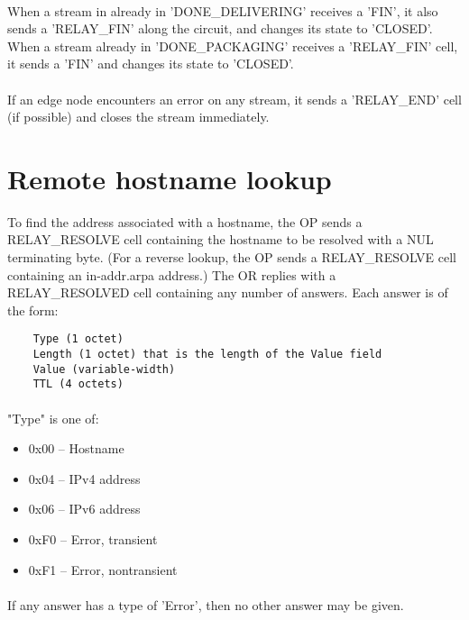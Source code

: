 \paragraph{}
When a stream in already in 'DONE\_DELIVERING' receives a 'FIN', it
also sends a 'RELAY\_FIN' along the circuit, and changes its state
to 'CLOSED'. When a stream already in 'DONE\_PACKAGING' receives a
'RELAY\_FIN' cell, it sends a 'FIN' and changes its state to
'CLOSED'.

\paragraph{}
If an edge node encounters an error on any stream, it sends a
'RELAY\_END' cell (if possible) and closes the stream immediately.

\section{Remote hostname lookup}
To find the address associated with a hostname, the OP sends a
RELAY\_RESOLVE cell containing the hostname to be resolved with a NUL
terminating byte. (For a reverse lookup, the OP sends a RELAY\_RESOLVE
cell containing an in-addr.arpa address.) The OR replies with a
RELAY\_RESOLVED cell containing any number of answers. Each answer is
of the form:

\begin{verbatim}
    Type (1 octet)
    Length (1 octet) that is the length of the Value field
    Value (variable-width)
    TTL (4 octets)
\end{verbatim}

\paragraph{}
"Type" is one of:
\begin{itemize}
    \item
    0x00 -- Hostname
    \item
    0x04 -- IPv4 address
    \item
    0x06 -- IPv6 address
    \item
    0xF0 -- Error, transient
    \item
    0xF1 -- Error, nontransient
\end{itemize}

\paragraph{}
If any answer has a type of 'Error', then no other answer may be
given.

